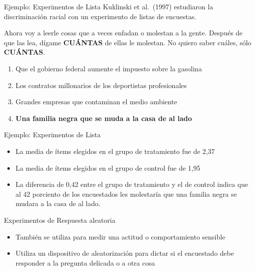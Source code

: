 \documentclass[
  ignorenonframetext,
]{beamer}
\providecommand{\tightlist}{%
  \setlength{\itemsep}{0pt}\setlength{\parskip}{0pt}}
\begin{document}
\begin{frame}{Ejemplo: Experimentos de Lista}
\protect\hypertarget{ejemplo-experimentos-de-lista-1}{}
Kuklinski et al.~(1997) estudiaron la discriminación racial con un
experimento de listas de encuestas.

Ahora voy a leerle cosas que a veces enfadan o molestan a la gente.
Después de que las lea, dígame \textbf{CUÁNTAS} de ellas le molestan. No
quiero saber cuáles, sólo \textbf{CUÁNTAS}.

\begin{enumerate}
\tightlist
\item
  Que el gobierno federal aumente el impuesto sobre la gasolina
\item
  Los contratos millonarios de los deportistas profesionales
\item
  Grandes empresas que contaminan el medio ambiente
\item
  \textbf{Una familia negra que se muda a la casa de al lado}
\end{enumerate}
\end{frame}

\begin{frame}{Ejemplo: Experimentos de Lista}
\protect\hypertarget{ejemplo-experimentos-de-lista-2}{}
\begin{itemize}
\tightlist
\item
  La media de ítems elegidos en el grupo de tratamiento fue de 2,37
\item
  La media de ítems elegidos en el grupo de control fue de 1,95
\item
  La diferencia de 0,42 entre el grupo de tratamiento y el de control
  indica que al 42 porciento de los encuestados les molestaría que una
  familia negra se mudara a la casa de al lado.
\end{itemize}
\end{frame}

\begin{frame}{Experimentos de Respuesta aleatoria}
\protect\hypertarget{experimentos-de-respuesta-aleatoria}{}
\begin{itemize}
\tightlist
\item
  También se utiliza para medir una actitud o comportamiento sensible
\item
  Utiliza un dispositivo de aleatorización para dictar si el encuestado
  debe responder a la pregunta delicada o a otra cosa
\end{itemize}
\end{frame}
\end{document}
